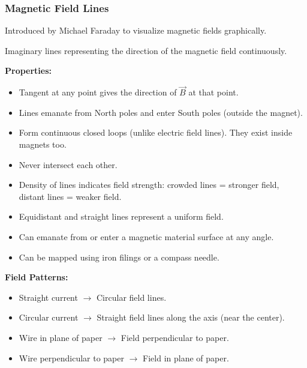 \transfade[duration=0.5]

\begin{frame}[t]
    \frametitle{\textcolor{deepnavy}{\textbf{Magnetic Field Lines}}}
    \renewcommand{\familydefault}{\rmdefault}
    \small

      \item<+-> Introduced by Michael Faraday to visualize magnetic fields graphically.
      \item<+-> Imaginary lines representing the direction of the magnetic field continuously.

    \item<+-> \textbf{Properties:}
        \begin{itemize}[<+->]
              \item Tangent at any point gives the direction of $\vec{B}$ at that point.
            \item Lines emanate from North poles and enter South poles (outside the magnet).
              \item Form continuous closed loops (unlike electric field lines).   They exist inside magnets too.
              \item Never intersect each other.
              \item Density of lines indicates field strength: crowded lines = stronger field, distant lines = weaker field.
              \item Equidistant and straight lines represent a uniform field. %
              \item Can emanate from or enter a magnetic material surface at any angle.
              \item Can be mapped using iron filings or a compass needle.
        \end{itemize}

    \item<+-> \textbf{Field Patterns:}
        \begin{itemize}[<+->]
              \item Straight current $\rightarrow$ Circular field lines.
              \item Circular current $\rightarrow$ Straight field lines along the axis (near the center).
              \item Wire in plane of paper $\rightarrow$ Field perpendicular to paper.
              \item Wire perpendicular to paper $\rightarrow$ Field in plane of paper.
        \end{itemize}
\end{frame}

